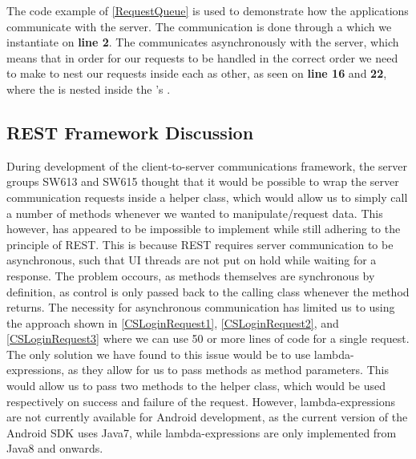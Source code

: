 The code example of \autoref{RequestQueue} is used to demonstrate how the
applications communicate with the server. The communication is done through a
 which we instantiate on \textbf{line 2}. The
 communicates asynchronously with the server, which means
that in order for our requests to be handled in the correct order we need to
make to nest our requests inside each as other, as seen on \textbf{line 16} and
\textbf{22}, where the  is nested inside the
's .

\subsection{REST Framework Discussion}
\nl
{}\nl
During development of the client-to-server communications framework, the server
groups SW613 and SW615 thought that it would be possible to wrap the server
communication requests inside a helper class, which would allow us to simply
call a number of methods whenever we wanted to manipulate/request data. This
however, has appeared to be impossible to implement while still adhering to the
principle of REST. This is because REST requires server communication to be
asynchronous, such that UI threads are not put on hold while waiting for a
response. The problem occours, as methods themselves are synchronous by
definition, as control is only passed back to the calling class whenever the
method returns. The necessity for asynchronous communication has limited us to
using the approach shown in \autoref{CSLoginRequest1},
\autoref{CSLoginRequest2}, and \autoref{CSLoginRequest3} where we can use 50 or
more lines of code for a single request. The only solution we have found to this
issue would be to use lambda-expressions, as they allow for us to pass methods
as method parameters.
This would allow us to pass two methods to the helper class, which would be used
respectively on success and failure of the request. However, lambda-expressions
are not currently available for Android development, as the current version of
the Android SDK uses Java7, while lambda-expressions are only implemented from
Java8 and onwards.













